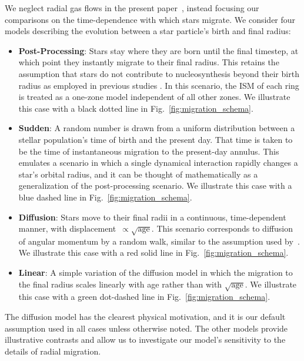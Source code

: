 \documentclass[draft2.tex]{subfiles}
\begin{document}
We neglect radial gas flows in the present paper~\citep{Bilitewski2012, 
Lacey1985}, instead focusing our comparisons on the time-dependence with which 
stars migrate. 
We consider four models describing the evolution between a star particle's 
birth and final radius: 
\begin{itemize} 
	\item \textbf{Post-Processing}: Stars stay where they are born until the 
	final timestep, at which point they instantly migrate to their final 
	radius. 
	This retains the assumption that stars do not contribute to nucleosynthesis 
	beyond their birth radius as employed in previous studies 
	\citep[e.g.][]{Minchev2013}. 
	In this scenario, the ISM of each ring is treated as a one-zone model 
	independent of all other zones. We illustrate this case with a black dotted 
	line in Fig.~\ref{fig:migration_schema}. 

	\item \textbf{Sudden}: A random number is drawn from a uniform distribution 
	between a stellar population's time of birth and the present day. 
	That time is taken to be the time of instantaneous migration to the 
	present-day annulus. 
	This emulates a scenario in which a single dynamical interaction rapidly 
	changes a star's orbital radius, and it can be thought of mathematically as 
	a generalization of the post-processing scenario. 
	We illustrate this case with a blue dashed line in 
	Fig.~\ref{fig:migration_schema}. 

	\item \textbf{Diffusion}: Stars move to their final radii in a continuous, 
	time-dependent manner, with displacement~$\propto \sqrt{\text{age}}$. 
	This scenario corresponds to diffusion of angular momentum by a random 
	walk, similar to the assumption used by~\citet{Frankel2018, Frankel2020}. 
	We illustrate this case with a red solid line in 
	Fig.~\ref{fig:migration_schema}. 

	\item \textbf{Linear}: A simple variation of the diffusion model in which 
	the migration to the final radius scales linearly with age rather than with 
	$\sqrt{\text{age}}$. We illustrate this case with a green dot-dashed line 
	in Fig.~\ref{fig:migration_schema}. 
\end{itemize} 
The diffusion model has the clearest physical motivation, and it is our default 
assumption used in all cases unless otherwise noted. 
The other models provide illustrative contrasts and allow us to investigate our 
model's sensitivity to the details of radial migration. 
\end{document}

